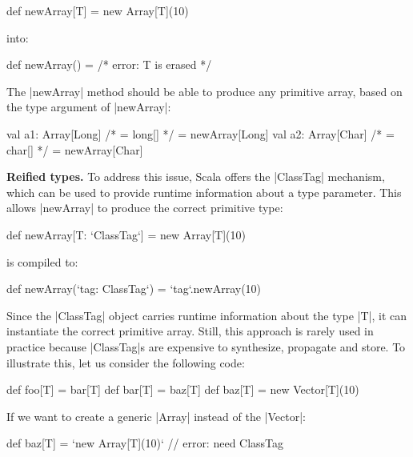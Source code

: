 \begin{lstlisting-nobreak}
 def newArray[T] = new Array[T](10)
\end{lstlisting-nobreak}

\noindent
into:

\begin{lstlisting-nobreak}
 def newArray() = /* error: T is erased */
\end{lstlisting-nobreak}

The |newArray| method should be able to produce any primitive array, based on the type argument of |newArray|:

\begin{lstlisting-nobreak}
 val a1: Array[Long] /* = long[] */ = newArray[Long]
 val a2: Array[Char] /* = char[] */ = newArray[Char]
\end{lstlisting-nobreak}

\textbf{Reified types.} To address this issue, Scala offers the |ClassTag| mechanism, which can be used to provide runtime information about a type parameter. This allows |newArray| to produce the correct primitive type:

\begin{lstlisting-nobreak}
 def newArray[T: `ClassTag`] = new Array[T](10)
\end{lstlisting-nobreak}

\noindent
is compiled to:

\begin{lstlisting-nobreak}
 def newArray(`tag: ClassTag`) = `tag`.newArray(10)
\end{lstlisting-nobreak}

Since the |ClassTag| object carries runtime information about the type |T|, it can instantiate the correct primitive array. Still, this approach is rarely used in practice because |ClassTag|s are expensive to synthesize, propagate and store.
To illustrate this, let us consider the following code:

\begin{lstlisting-nobreak}
 def foo[T] = bar[T]
 def bar[T] = baz[T]
 def baz[T] = new Vector[T](10)
\end{lstlisting-nobreak}

If we want to create a generic |Array| instead of the |Vector|:

\begin{lstlisting-nobreak}
 def baz[T] = `new Array[T](10)` // error: need ClassTag
\end{lstlisting-nobreak}

